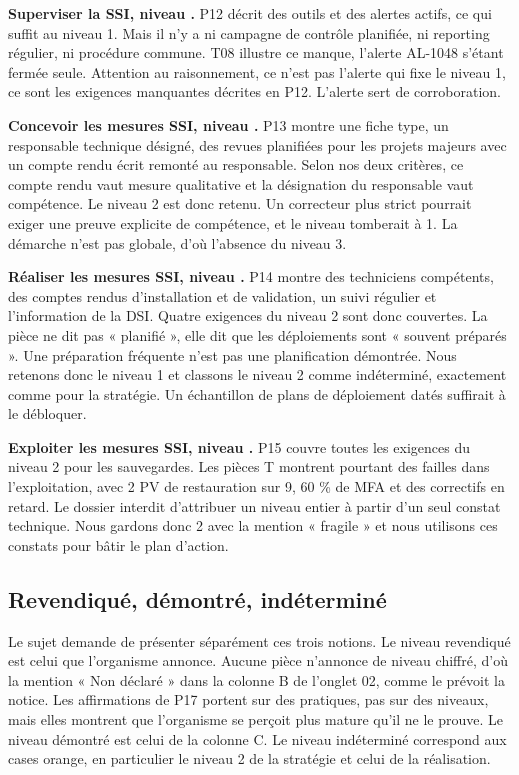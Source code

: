 \documentclass[11pt,a4paper]{article}
\begin{document}
\textbf{Superviser la SSI, niveau .} P12 décrit des outils et des alertes actifs, ce qui suffit au niveau 1. Mais il n'y a ni campagne de contrôle planifiée, ni reporting régulier, ni procédure commune. T08 illustre ce manque, l'alerte AL-1048 s'étant fermée seule. Attention au raisonnement, ce n'est pas l'alerte qui fixe le niveau 1, ce sont les exigences manquantes décrites en P12. L'alerte sert de corroboration.

\textbf{Concevoir les mesures SSI, niveau .} P13 montre une fiche type, un responsable technique désigné, des revues planifiées pour les projets majeurs avec un compte rendu écrit remonté au responsable. Selon nos deux critères, ce compte rendu vaut mesure qualitative et la désignation du responsable vaut compétence. Le niveau 2 est donc retenu. Un correcteur plus strict pourrait exiger une preuve explicite de compétence, et le niveau tomberait à 1. La démarche n'est pas globale, d'où l'absence du niveau 3.

\textbf{Réaliser les mesures SSI, niveau .} P14 montre des techniciens compétents, des comptes rendus d'installation et de validation, un suivi régulier et l'information de la DSI. Quatre exigences du niveau 2 sont donc couvertes. La pièce ne dit pas « planifié », elle dit que les déploiements sont « souvent préparés ». Une préparation fréquente n'est pas une planification démontrée. Nous retenons donc le niveau 1 et classons le niveau 2 comme indéterminé, exactement comme pour la stratégie. Un échantillon de plans de déploiement datés suffirait à le débloquer.

\textbf{Exploiter les mesures SSI, niveau .} P15 couvre toutes les exigences du niveau 2 pour les sauvegardes. Les pièces T montrent pourtant des failles dans l'exploitation, avec 2 PV de restauration sur 9, 60 \% de MFA et des correctifs en retard. Le dossier interdit d'attribuer un niveau entier à partir d'un seul constat technique. Nous gardons donc 2 avec la mention « fragile » et nous utilisons ces constats pour bâtir le plan d'action.

\subsection{Revendiqué, démontré, indéterminé}

Le sujet demande de présenter séparément ces trois notions. Le niveau revendiqué est celui que l'organisme annonce. Aucune pièce n'annonce de niveau chiffré, d'où la mention « Non déclaré » dans la colonne B de l'onglet 02, comme le prévoit la notice. Les affirmations de P17 portent sur des pratiques, pas sur des niveaux, mais elles montrent que l'organisme se perçoit plus mature qu'il ne le prouve. Le niveau démontré est celui de la colonne C. Le niveau indéterminé correspond aux cases orange, en particulier le niveau 2 de la stratégie et celui de la réalisation.
\end{document}
